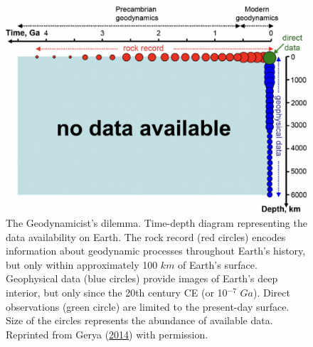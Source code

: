 \begin{figure}[htbp]

{\centering \includegraphics[width=1\linewidth,]{assets/figs/chpt1/gerya2014} 

}

\caption[The Geodynamicist's dilemma]{The Geodynamicist's dilemma. Time-depth diagram representing the data availability on Earth. The rock record (red circles) encodes information about geodynamic processes throughout Earth's history, but only within approximately 100 \(km\) of Earth's surface. Geophysical data (blue circles) provide images of Earth's deep interior, but only since the 20th century CE (or 10\(^{-7}\) \(Ga\)). Direct observations (green circle) are limited to the present-day surface. Size of the circles represents the abundance of available data. Reprinted from Gerya (\protect\hyperlink{ref-gerya2014}{2014}) with permission.}\label{fig:sparse}
\end{figure}

